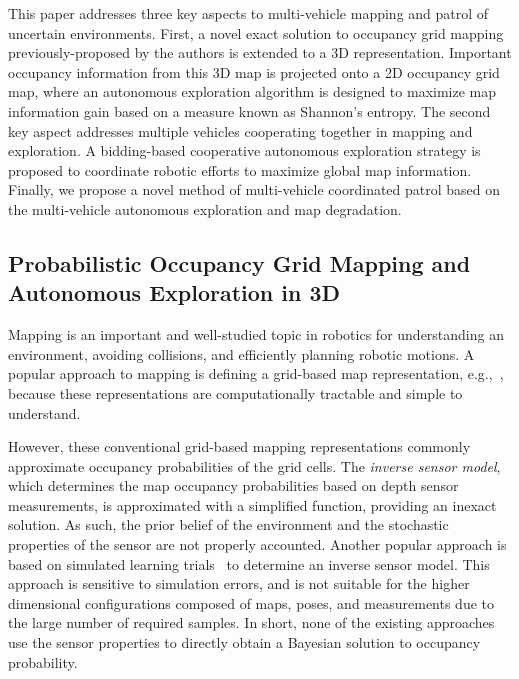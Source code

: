 \documentclass[smallextended]{svjour3}       %
\begin{document}
This paper addresses three key aspects to multi-vehicle mapping and patrol of uncertain environments. First, a novel exact solution to occupancy grid mapping previously-proposed by the authors is extended to a 3D representation. Important occupancy information from this 3D map is projected onto a 2D occupancy grid map, where an autonomous exploration algorithm is designed to maximize map information gain based on a measure known as Shannon's entropy. The second key aspect addresses multiple vehicles cooperating together in mapping and exploration. A bidding-based cooperative autonomous exploration strategy is proposed to coordinate robotic efforts to maximize global map information. Finally, we propose a novel method of multi-vehicle coordinated patrol based on the multi-vehicle autonomous exploration and map degradation.

\subsection{Probabilistic Occupancy Grid Mapping and Autonomous Exploration in 3D}


Mapping is an important and well-studied topic in robotics for understanding an environment, avoiding collisions, and efficiently planning robotic motions.
A popular approach to mapping is defining a grid-based map representation, e.g.,~\cite{WolSuk05,MeyBeiBur12,TanThoWolBus14}, because these representations are computationally tractable and simple to understand.

However, these conventional grid-based mapping representations commonly approximate occupancy probabilities of the grid cells. The \emph{inverse sensor model}, which determines the map occupancy probabilities based on depth sensor measurements, is approximated with a simplified function, providing an inexact solution. As such, the prior belief of the environment and the stochastic properties of the sensor are not properly accounted. Another popular approach is based on simulated learning trials~\cite{Thr01,ThrBurFox05,SouMaiGon12} to determine an inverse sensor model. This approach is sensitive to simulation errors, and is not suitable for the higher dimensional configurations composed of maps, poses, and measurements due to the large number of required samples. In short, none of the existing approaches use the sensor properties to directly obtain a Bayesian solution to occupancy probability.
\end{document}
